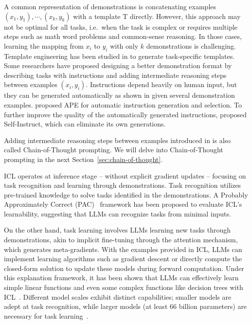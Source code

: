 A common representation of demonstrations is concatenating examples $(x_1, y_1), \cdots, (x_k, y_k)$ with a template T directly.
However, this approach may not be optimal for all tasks, i.e.\ when the task is complex or requires multiple steps such as math word problems and common-sense reasoning.
In those cases, learning the mapping from $x_i$ to $y_i$ with only $k$ demonstrations is challenging.
Template engineering has been studied in \textcite{liu2021pretrain, liu2022good} to generate task-specific templates.
Some researchers have proposed designing a better demonstration format by describing tasks with instructions and adding intermediate reasoning steps between examples $(x_i, y_i)$.
Instructions depend heavily on human input, but they can be generated automatically as shown in \textcite{honovich2022instruction} given several demonstration examples.
\textcite{zhou2023large} proposed APE for automatic instruction generation and selection.
To further improve the quality of the automatically generated instructions, \textcite{wang2022selfinstruct} proposed Self-Instruct, which can eliminate its own generations.

Adding intermediate reasoning steps between examples introduced in \textcite{wang2023large} is also called Chain-of-Thought prompting.
We will delve into Chain-of-Thought prompting in the next Section~\ref{sec:chain-of-thought}.

ICL operates at inference stage -- without explicit gradient updates -- focusing on task recognition and learning through demonstrations.
Task recognition utilizes pre-trained knowledge to solve tasks identified in the demonstrations.
A Probably Approximately Correct (PAC)~\cite{wies2023learnability} framework has been proposed to evaluate ICL’s learnability, suggesting that LLMs can recognize tasks from minimal inputs.

On the other hand, task learning involves LLMs learning new tasks through demonstrations, akin to implicit fine-tuning through the attention mechanism, which generates meta-gradients.
With the examples provided in ICL, LLMs can implement learning algorithms such as gradient descent or directly compute the closed-form solution to update these models during forward computation.
Under this explanation framework, it has been shown that LLMs can effectively learn simple linear functions and even some complex functions like decision trees with ICL~\cite{akyurek2022what}.
Different model scales exhibit distinct capabilities; smaller models are adept at task recognition, while larger models (at least 66 billion parameters) are necessary for task learning~\cite{pan2023what}.

